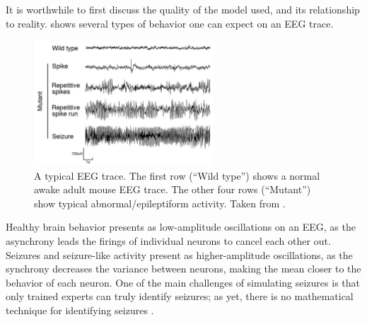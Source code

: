 It is worthwhile to first discuss the quality of the model used, and its relationship to reality.
 shows several types of behavior one can expect on an EEG trace.
\begin{figure}[ht]
  \centering
  \includegraphics[width=0.6\textwidth]{figure/eeg}
  \caption[Typical EEG trace]{A typical EEG trace.
    The first row (``Wild type'') shows a normal awake adult mouse EEG trace.
    The other four rows (``Mutant'') show typical abnormal/epileptiform activity.
    Taken from \cite{Ljungberg2009}.
  }
  \label{fig:eeg}
\end{figure}
Healthy brain behavior presents as low-amplitude oscillations on an EEG, as the asynchrony leads the firings of individual neurons to cancel each other out.
Seizures and seizure-like activity present as higher-amplitude oscillations, as the synchrony decreases the variance between neurons, making the mean closer to the behavior of each neuron.
One of the main challenges of simulating seizures is that only trained experts can truly identify seizures; as yet, there is no mathematical technique for identifying seizures \cite{Kandel2013}.

